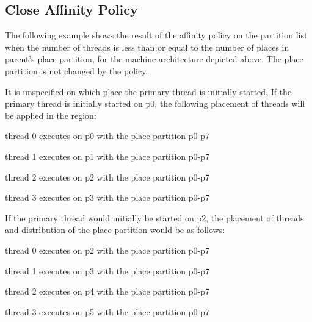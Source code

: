 \subsection{Close Affinity Policy}
\label{subsec:affinity_close}

The following example shows the result of the  affinity policy on 
the partition list when the number of threads is less than or equal to the number 
of places in parent's place partition, for the machine architecture depicted above. 
The place partition is not changed by the  policy.



It is unspecified on which place the primary thread is initially started. If the 
primary thread is initially started on p0, the following placement of threads will 
be applied in the  region:

\begin{compactitem}
\item thread 0 executes on p0 with the place partition p0-p7

\item thread 1 executes on p1 with the place partition p0-p7

\item thread 2 executes on p2 with the place partition p0-p7

\item thread 3 executes on p3 with the place partition p0-p7
\end{compactitem}

If the primary thread would initially be started on p2, the placement of threads 
and distribution of the place partition would be as follows:

\begin{compactitem}
\item thread 0 executes on p2 with the place partition p0-p7

\item thread 1 executes on p3 with the place partition p0-p7

\item thread 2 executes on p4 with the place partition p0-p7

\item thread 3 executes on p5 with the place partition p0-p7
\end{compactitem}


